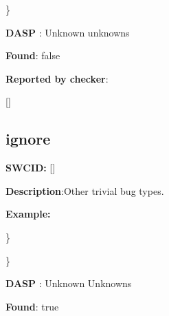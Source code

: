 \documentclass{article}
\begin{document}
\} 

\textbf{DASP} : Unknown unknowns

\textbf{Found}: false

\textbf{Reported by checker}: 
\begin{ffcode} 

[]
\end{ffcode} 
\subsection{ignore} 
\textbf{SWC{\textunderscore }ID:} []

\textbf{Description}:Other trivial bug types.


\textbf{Example:} 
\begin{ffcode} 


\end{ffcode} 
\} 

\} 

\textbf{DASP} : Unknown Unknowns

\textbf{Found}: true
\end{document}
